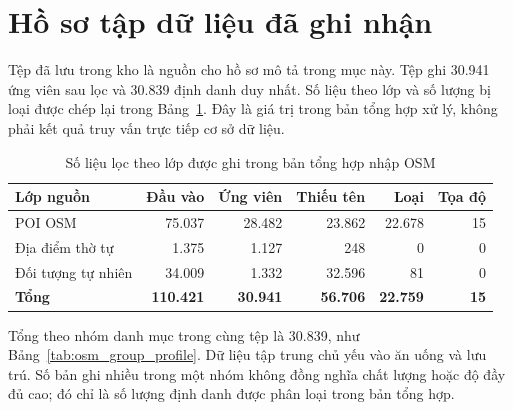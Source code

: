 \section{Hồ sơ tập dữ liệu đã ghi nhận}

Tệp đã lưu trong kho  là nguồn cho hồ sơ mô tả trong mục này. Tệp ghi 30.941 ứng viên sau lọc và 30.839 định danh duy nhất. Số liệu theo lớp và số lượng bị loại được chép lại trong Bảng~\ref{tab:osm_layer_profile}. Đây là giá trị trong bản tổng hợp xử lý, không phải kết quả truy vấn trực tiếp cơ sở dữ liệu.

\begin{table}[htbp]
    \centering
    \caption{Số liệu lọc theo lớp được ghi trong bản tổng hợp nhập OSM}
    \label{tab:osm_layer_profile}
    \renewcommand{\arraystretch}{1.2}
    \small
    \setlength{\tabcolsep}{3.5pt}
    \begin{tabularx}{\textwidth}{>{\raggedright\arraybackslash}X r r r r r}
        \toprule
        \textbf{Lớp nguồn} & \textbf{Đầu vào} & \textbf{Ứng viên} & \textbf{Thiếu tên} & \textbf{Loại} & \textbf{Tọa độ} \\
        \midrule
        POI OSM & 75.037 & 28.482 & 23.862 & 22.678 & 15 \\
        Địa điểm thờ tự & 1.375 & 1.127 & 248 & 0 & 0 \\
        Đối tượng tự nhiên & 34.009 & 1.332 & 32.596 & 81 & 0 \\
        \midrule
        \textbf{Tổng} & \textbf{110.421} & \textbf{30.941} & \textbf{56.706} & \textbf{22.759} & \textbf{15} \\
        \bottomrule
    \end{tabularx}
\end{table}

Tổng theo nhóm danh mục trong cùng tệp là 30.839, như Bảng~\ref{tab:osm_group_profile}. Dữ liệu tập trung chủ yếu vào ăn uống và lưu trú. Số bản ghi nhiều trong một nhóm không đồng nghĩa chất lượng hoặc độ đầy đủ cao; đó chỉ là số lượng định danh được phân loại trong bản tổng hợp.

